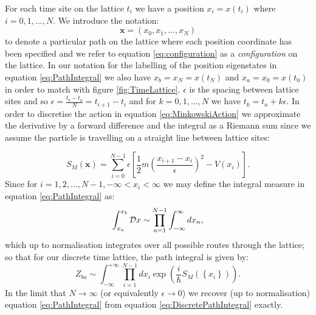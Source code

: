 \documentclass[12pt]{article}
\begin{document}
        For each time site on the lattice $t_i$ we have a position $x_i = x\left(t_i\right)$ where $i=0,1,\dots,N$. We introduce the notation:
        \begin{equation}
            \label{eq:configuration}
            \bm{x}=\left(x_0,x_1,\dots,x_{N}\right)
        \end{equation}
        to denote a particular path on the lattice where each position coordinate has been specified and we refer to equation \ref{eq:configuration} as a \textit{configuration} on the lattice. In our notation for the labelling of the position eigenstates in equation \ref{eq:PathIntegral} we also have $x_b=x_{N}=x\left(t_{N}\right)$ and $x_a=x_0=x\left(t_0\right)$ in order to match with figure \ref{fig:TimeLattice}. $ \epsilon $ is the spacing between lattice sites and so $\epsilon = \frac{t_b-t_a}{N} = t_{i+1}-t_i$ and for $k=0,1,\dots,N$ we have $ t_k = t_a + k \epsilon $. In order to discretise the action in equation \ref{eq:MinkowskiAction} we approximate the derivative by a forward difference and the integral as a Riemann sum since we assume the particle is travelling on a straight line between lattice sites:
        
        \begin{equation}
            \label{eq:DiscreteMinkowskiAction}
            S_{M}\left(\bm{x}\right) = \sum_{i=0}^{N-1} \epsilon \left[\frac{1}{2}m\left(\frac{x_{i+1}-x_{i}}{\epsilon}\right)^{2} - V\left(x_i\right)\right].
        \end{equation}
        Since  for $i=1,2,\dots,N-1, -\infty < x_i < \infty$ we may define the integral measure in equation \ref{eq:PathIntegral} as:
        \begin{equation}
            \label{eq:IntegralMeasure}
            \int_{x_a}^{x_b} {\cal D} x \sim \prod_{n=1}^{N-1}\int_{-\infty}^{\infty}dx_n,
        \end{equation}
        which up to normalisation integrates over all possible routes through the lattice; so that for our discrete time lattice, the path integral is given by:
        \begin{equation}
            \label{eq:DiscretePathIntegral}
            Z_{ba} \sim \int^{+\infty}_{-\infty}\prod_{i=1}^{N-1}dx_i \exp{\left(\frac{i}{\hbar}S_M\left(\left\{x_i\right\}\right)\right)}.
        \end{equation}
        In the limit that $N\rightarrow \infty$ (or equivalently $\epsilon \rightarrow 0$) we recover (up to normalisation) equation \ref{eq:PathIntegral} from equation \ref{eq:DiscretePathIntegral} exactly. 
\end{document}
